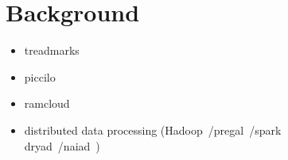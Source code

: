 \section{Background}
\label{sec:background}

\begin{itemize}
    \item treadmarks~\cite{Keleher1994} \\
    \item piccilo~\cite{piccolo} \\
    \item ramcloud~\cite{Ousterhout:2015:RSS:2818727.2806887}\\
    \item distributed data processing (Hadoop~\cite{Dean2004}/pregal~\cite{Malewicz:2010:PSL:1807167.1807184}/spark~\cite{180560} \\ dryad~\cite{Isard:2007:DDD:1272996.1273005}/naiad~\cite{Murray:2013:NTD:2517349.2522738}) \\
\end{itemize}
